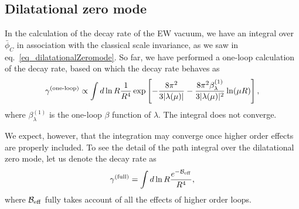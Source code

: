 \documentclass[12pt]{article}
\begin{document}
\subsection{Dilatational zero mode}

In the calculation of the decay rate of the EW vacuum, we have an
integral over $\bar\phi_C$ in association with the classical scale
invariance, as we saw in eq.~\eqref{eq_dilatationalZeromode}.  So far,
we have performed a one-loop calculation of the decay rate, based on
which the decay rate behaves as
\begin{align}
  \gamma^{\rm (one\mathhyphen loop)}
  \propto\int d\ln R
  \frac{1}{R^4}
  \exp \left[
    - \frac{8\pi^2}{3|\lambda (\mu)|}
    - \frac{8\pi^2 \beta_\lambda^{(1)}}{3|\lambda (\mu)|^2} \ln ( \mu R ) 
  \right],
  \label{gamma(1-loop)}
\end{align}
where $\beta_\lambda^{(1)}$ is the one-loop $\beta$ function of
$\lambda$.  The integral does not converge.  

We expect, however, that the integration may converge once higher
order effects are properly included.  To see the detail of the path
integral over the dilatational zero mode, let us denote the decay rate
as
\begin{align}
  \gamma^{\rm (full)} = \int d\ln R
  \frac{e^{-\mathcal B_{\rm eff}}}{R^4},
\end{align}
where $\mathcal{B}_{\rm eff}$ fully takes account of all the effects of higher
order loops.
\end{document}
